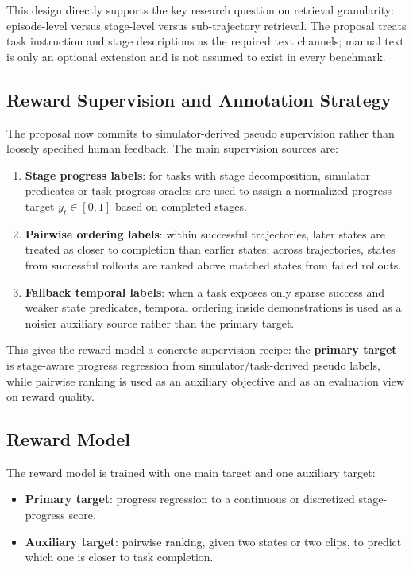 This design directly supports the key research question on retrieval granularity:
episode-level versus stage-level versus sub-trajectory retrieval.
The proposal treats task instruction and stage descriptions as the required text channels;
manual text is only an optional extension and is not assumed to exist in every benchmark.

\subsection{Reward Supervision and Annotation Strategy}

The proposal now commits to simulator-derived pseudo supervision rather than loosely specified human feedback.
The main supervision sources are:
\begin{enumerate}
  \item \textbf{Stage progress labels}: for tasks with stage decomposition, simulator predicates or task progress oracles are used to assign a normalized progress target $y_t \in [0, 1]$ based on completed stages.
  \item \textbf{Pairwise ordering labels}: within successful trajectories, later states are treated as closer to completion than earlier states; across trajectories, states from successful rollouts are ranked above matched states from failed rollouts.
  \item \textbf{Fallback temporal labels}: when a task exposes only sparse success and weaker state predicates, temporal ordering inside demonstrations is used as a noisier auxiliary source rather than the primary target.
\end{enumerate}

This gives the reward model a concrete supervision recipe:
the \textbf{primary target} is stage-aware progress regression from simulator/task-derived pseudo labels,
while pairwise ranking is used as an auxiliary objective and as an evaluation view on reward quality.

\subsection{Reward Model}

The reward model is trained with one main target and one auxiliary target:
\begin{itemize}
  \item \textbf{Primary target}: progress regression to a continuous or discretized stage-progress score.
  \item \textbf{Auxiliary target}: pairwise ranking, given two states or two clips, to predict which one is closer to task completion.
\end{itemize}


